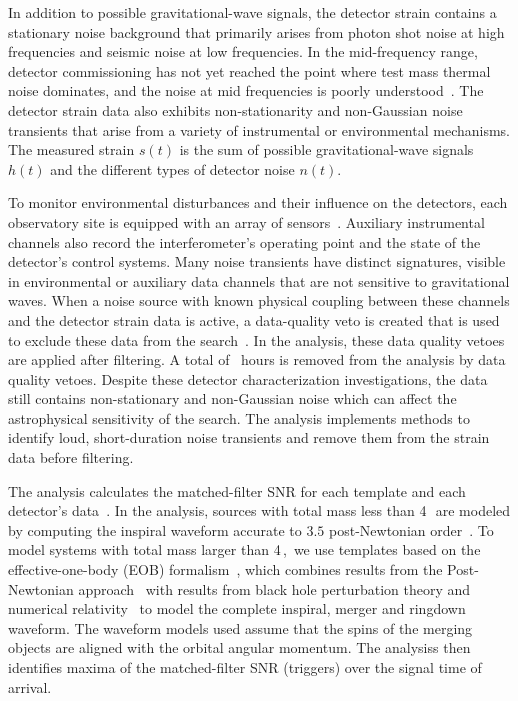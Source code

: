 In addition to possible gravitational-wave signals, the detector strain
contains a stationary noise background that primarily arises from photon shot
noise at high frequencies and seismic noise at low frequencies.  In the
mid-frequency range, detector commissioning has not yet reached the point
where test mass thermal noise dominates, and the noise at mid frequencies is
poorly
understood~\cite{GW150914-DETECTORS,GW150914-DETCHAR,InstrumentNoisePaper}.
The detector strain data also exhibits non-stationarity and non-Gaussian noise
transients that arise from a variety of instrumental or environmental
mechanisms. The measured strain $s(t)$ is the sum of possible
gravitational-wave signals $h(t)$ and the different types of detector noise
$n(t)$.

To monitor environmental disturbances and their influence on the detectors,
each observatory site is equipped with an array of
sensors~\cite{Effler:2014zpa}.  Auxiliary instrumental channels also record
the interferometer's operating point and the state of the detector's control
systems. Many noise transients have distinct signatures, visible in
environmental or auxiliary data channels that are not sensitive to
gravitational waves. When a noise source with known physical coupling between
these channels and the detector strain data is active, a data-quality veto is
created that is used to exclude these data from the
search~\cite{GW150914-DETCHAR}.
In the \pycbc{} analysis, these data quality vetoes are applied after filtering.  A
total of \CatTwoVetoTime{}~hours is removed from the analysis by data quality
vetoes.  Despite these detector characterization investigations, the data
still contains non-stationary and non-Gaussian noise which can affect the
astrophysical sensitivity of the search. The \pycbc{} analysis implements methods to
identify loud, short-duration noise transients and remove them from the strain
data before filtering.


The \pycbc{} analysis calculates the matched-filter SNR for each
template and each detector's data~\cite{Allen:2005fk,Cannon2010}.  In the
\pycbc{} analysis, sources with total mass less than 4$\,$\Msun~are modeled by
computing the inspiral waveform accurate to $3.5$ post-Newtonian
order~\cite{Blanchet:1995ez,Droz:1999qx,Blanchet:2004ek}.  To model systems
with total mass larger than 4$\,$\Msun,~we use templates based on the
effective-one-body (EOB) formalism~\cite{Buonanno:2000ef}, which combines
results from the Post-Newtonian
approach~\cite{Blanchet:1995ez,Blanchet:2004ek} with results from black hole
perturbation theory and numerical
relativity~\cite{Taracchini:2013rva,Puerrer:2014fza} to model the complete
inspiral, merger and ringdown waveform.  The waveform models used assume that
the spins of the merging objects are aligned with the orbital angular
momentum. The analysiss then identifies maxima of the matched-filter
SNR (triggers)
over the signal time of arrival.

